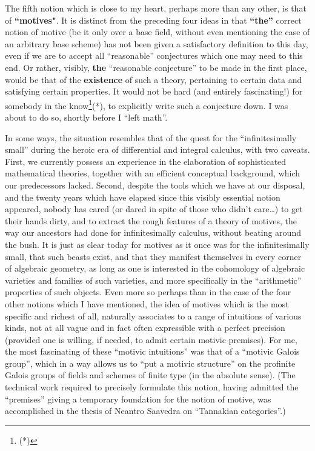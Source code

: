 The fifth notion which is close to my heart, perhaps more than any other, is that of
\textbf{``motives"}.
It is distinct from the preceding four ideas in that
\textbf{``the''} correct notion of motive (be it only over a base field, without even
mentioning the case of an arbitrary base scheme) has not been given a 
satisfactory definition to this day, even if we are to accept all ``reasonable'' conjectures
which one may need to this end. Or rather, visibly, 
\textbf{the} ``reasonable conjecture'' to be made in the first place, would be that of the
\textbf{existence} of such a theory, pertaining to certain data and satisfying certain
properties.
It would not be hard (and entirely fascinating!) for somebody in the
know\footnote{(*)}(*),
to explicitly write such a conjecture down.
I was about to do so, shortly before I ``left math''.

In some ways, the situation resembles that of the quest for the ``infinitesimally small''
during the heroic era of differential and integral calculus, with two caveats.
First, we currently possess an experience in the elaboration of sophisticated mathematical
theories, together with an efficient conceptual background, which our predecessors lacked. 
Second, despite the tools which we have at our disposal,
and the twenty years which have elapsed since this visibly essential notion appeared,
nobody has cared (or dared in spite of those who didn't care\ldots) to get their hands dirty,
and to extract the rough features of a theory of motives, the way our ancestors had done
for infinitesimally calculus, without beating around the bush.
It is just as clear today for motives as it once was for the infinitesimally small, that
such beasts exist, and that they manifest themselves in every corner of algebraic
geometry, as long as one is interested in the cohomology of algebraic varieties and 
families of such varieties, and more specifically in the ``arithmetic'' properties of
such objects. 
Even more so perhaps than in the case of the four other notions which I have mentioned, the
idea of motives which is the most specific and richest of all, naturally associates to a
range of intuitions of various kinds, not at all vague and in fact often 
expressible with a perfect precision (provided one is willing, if needed, to admit certain motivic
premises). For me, the most fascinating of these ``motivic intuitions'' was that of
a ``motivic Galois group'', which in a way allows us to ``put a motivic structure'' 
on the profinite Galois groups of fields and schemes of finite type (in the absolute
sense).
(The technical work required to precisely formulate this notion, 
having admitted the ``premises'' giving a temporary foundation for the notion of motive,
was accomplished in the thesis of Neantro Saavedra on ``Tannakian categories''.)

